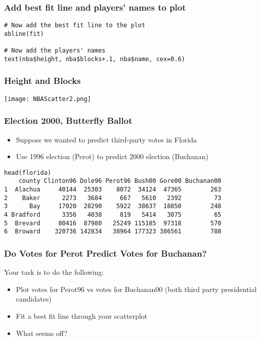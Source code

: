 \documentclass[handout,compress]{beamer}
\begin{document}
\begin{frame}[fragile]
 \frametitle{Add best fit line and players' names to plot}
  \begin{shaded}
 \begin{small}
\begin{verbatim}
# Now add the best fit line to the plot
abline(fit)

# Now add the players' names
text(nba$height, nba$blocks+.1, nba$name, cex=0.6)

\end{verbatim}
\end{small}
\end{shaded}
\end{frame}

\begin{frame}[fragile]
 \frametitle{Height and Blocks}
\begin{center}
\texttt{[image: NBAScatter2.png]}
\end{center}
\end{frame}

\begin{frame}[fragile]
 \frametitle{Election 2000, Butterfly Ballot}
\begin{itemize}
\item Suppose we wanted to predict third-party votes in Florida 
\item Use 1996 election (Perot) to predict 2000 election (Buchanan)
\end{itemize}
\begin{shaded}
\begin{small}
\begin{verbatim}
head(florida)
    county Clinton96 Dole96 Perot96 Bush00 Gore00 Buchanan00
1  Alachua     40144  25303    8072  34124  47365        263
2    Baker      2273   3684     667   5610   2392         73
3      Bay     17020  28290    5922  38637  18850        248
4 Bradford      3356   4038     819   5414   3075         65
5  Brevard     80416  87980   25249 115185  97318        570
6  Broward    320736 142834   38964 177323 386561        788
\end{verbatim}
\end{small}
\end{shaded}
\end{frame}

\begin{frame}[fragile]
 \frametitle{Do Votes for Perot Predict Votes for Buchanan?}
 Your task is to do the following:
 \begin{itemize} \itemsep1em
 	\item Plot votes for Perot96 vs votes for Buchanan00 (both third party presidential candidates)
 	\item Fit a best fit line through your scatterplot
 	\item What seems off?
\end{itemize}
\end{frame}
\end{document}
